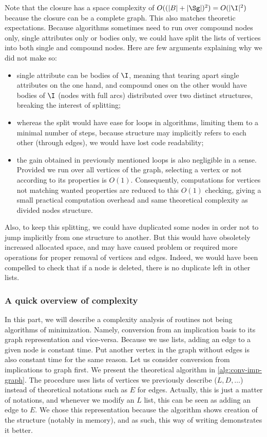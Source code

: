 Note that the closure has a space complexity of $O((|B| + |\Sg|)^2) = O(|\I|^2)$
because the closure can be a complete graph. This also matches theoretic 
expectations. Because algorithms sometimes need to run over compound nodes 
only, single attributes only or bodies only, we could have split the lists 
of vertices into both single and compound nodes. Here are few arguments 
explaining why we did not make so:
\begin{itemize}
	\item single attribute can be bodies of $\I$, meaning that tearing apart
	single attributes on the one hand, and compound ones on the other would 
	have bodies of $\I$ (nodes with full arcs) distributed over two 
	distinct structures, breaking the interest of splitting;
	
	\item whereas the split would have ease for loops in algorithms, limiting
	them to a minimal number of steps, because structure may implicitly refers
	to each other (through edges), we would have lost code readability;
	
	\item the gain obtained in previously mentioned loops is also negligible
	in a sense. Provided we run over all vertices  of the graph, selecting a
	vertex or not according to its properties is $O(1)$. Consequently, 
	computations for vertices not matching wanted properties are reduced to this
	$O(1)$ checking, giving a small practical computation overhead and same 
	theoretical complexity as divided nodes structure.
\end{itemize}
\noindent Also, to keep this splitting, we could have duplicated some nodes in
order not to jump implicitly from one structure to another. But this would have
obsoletely increased allocated space, and may have caused problem or required 
more operations for proper removal of vertices and edges. Indeed, we would have
been compelled to check that if a node is deleted, there is no duplicate left
in other lists. 

\subsubsection{A quick overview of complexity}

In this part, we will describe a complexity analysis of routines not being 
algorithms of minimization. Namely, conversion from an implication basis to
its graph representation and vice-versa. Because we use lists, adding an edge 
to a given node is constant time. Put another vertex in the graph without edges 
is also constant time for the same reason. Let us consider conversion from 
implications to graph first. We present the theoretical algorithm in 
\ref{alg:conv-imp-graph}. The procedure uses lists of vertices we previously
describe ($L, D, \dots $) instead of theoretical notations such as $E$ for 
edges. Actually, this is just a matter of notations, and whenever
we modify an $L$ list, this can be seen as adding an edge to $E$. We chose this
representation because the algorithm shows creation of the structure (notably 
in memory), and as such, this way of writing demonstrates it better.

